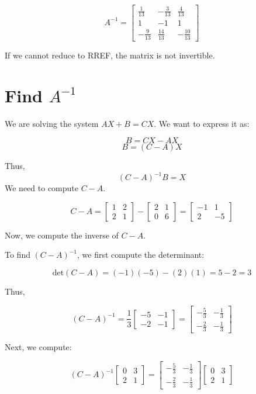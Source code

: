\documentclass{article}
\begin{document}
\[
A^{-1} = \begin{bmatrix}
\frac{1}{13} & -\frac{3}{13} & \frac{4}{13} \\
1 & -1 & 1 \\
-\frac{9}{13} & \frac{14}{13} & -\frac{10}{13}
\end{bmatrix}
\]

If we cannot reduce to RREF, the matrix is not invertible.

\hfill
\section*{Find $A^{-1}$}

We are solving the system $AX + B = CX$. We want to express it as:

\[
B = CX - AX
\]
\[
B = (C - A)X
\]

Thus,
\[
(C - A)^{-1}B = X
\]
We need to compute $C - A$.

\[
C - A = \begin{bmatrix}
1 & 2 \\
2 & 1
\end{bmatrix}
-
\begin{bmatrix}
2 & 1 \\
0 & 6
\end{bmatrix}
=
\begin{bmatrix}
-1 & 1 \\
2 & -5
\end{bmatrix}
\]

Now, we compute the inverse of $C - A$.

To find $(C - A)^{-1}$, we first compute the determinant:

\[
\text{det}(C - A) = (-1)(-5) - (2)(1) = 5 - 2 = 3
\]

Thus,

\[
(C - A)^{-1} = \frac{1}{3}
\begin{bmatrix}
-5 & -1 \\
-2 & -1
\end{bmatrix}
=
\begin{bmatrix}
-\frac{5}{3} & -\frac{1}{3} \\
-\frac{2}{3} & -\frac{1}{3}
\end{bmatrix}
\]

Next, we compute:

\[
(C - A)^{-1}
\begin{bmatrix}
0 & 3 \\
2 & 1
\end{bmatrix}
=
\begin{bmatrix}
-\frac{5}{3} & -\frac{1}{3} \\
-\frac{2}{3} & -\frac{1}{3}
\end{bmatrix}
\begin{bmatrix}
0 & 3 \\
2 & 1
\end{bmatrix}
\]
\end{document}
